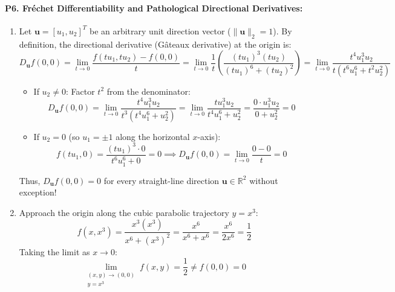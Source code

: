 \paragraph{P6. Fréchet Differentiability and Pathological Directional Derivatives:}
\begin{enumerate}[label=(\alph*)]
    \item Let $\mathbf{u} = [u_1, u_2]^T$ be an arbitrary unit direction vector ($\|\mathbf{u}\|_2 = 1$). By definition, the directional derivative (Gâteaux derivative) at the origin is:
    \begin{equation*}
    D_{\mathbf{u}} f(0, 0) = \lim_{t \to 0} \frac{f(t u_1, t u_2) - f(0, 0)}{t} = \lim_{t \to 0} \frac{1}{t} \left( \frac{(t u_1)^3 (t u_2)}{(t u_1)^6 + (t u_2)^2} \right) = \lim_{t \to 0} \frac{t^4 u_1^3 u_2}{t \left( t^6 u_1^6 + t^2 u_2^2 \right)}
    \end{equation*}
    \begin{itemize}
        \item If $u_2 \ne 0$: Factor $t^2$ from the denominator:
        \begin{equation*}
        D_{\mathbf{u}} f(0, 0) = \lim_{t \to 0} \frac{t^4 u_1^3 u_2}{t^3 (t^4 u_1^6 + u_2^2)} = \lim_{t \to 0} \frac{t u_1^3 u_2}{t^4 u_1^6 + u_2^2} = \frac{0 \cdot u_1^3 u_2}{0 + u_2^2} = 0
        \end{equation*}
        \item If $u_2 = 0$ (so $u_1 = \pm 1$ along the horizontal $x$-axis):
        \begin{equation*}
        f(t u_1, 0) = \frac{(t u_1)^3 \cdot 0}{t^6 u_1^6 + 0} = 0 \implies D_{\mathbf{u}} f(0, 0) = \lim_{t \to 0} \frac{0 - 0}{t} = 0
        \end{equation*}
    \end{itemize}
    Thus, $D_{\mathbf{u}} f(0, 0) = 0$ for every straight-line direction $\mathbf{u} \in \mathbb{R}^2$ without exception!
    
    \item Approach the origin along the cubic parabolic trajectory $y = x^3$:
    \begin{equation*}
    f(x, x^3) = \frac{x^3 (x^3)}{x^6 + (x^3)^2} = \frac{x^6}{x^6 + x^6} = \frac{x^6}{2 x^6} = \frac{1}{2}
    \end{equation*}
    Taking the limit as $x \to 0$:
    \begin{equation*}
    \lim_{\substack{(x, y) \to (0, 0) \\ y = x^3}} f(x, y) = \frac{1}{2} \ne f(0, 0) = 0
    \end{equation*}


\end{enumerate}
